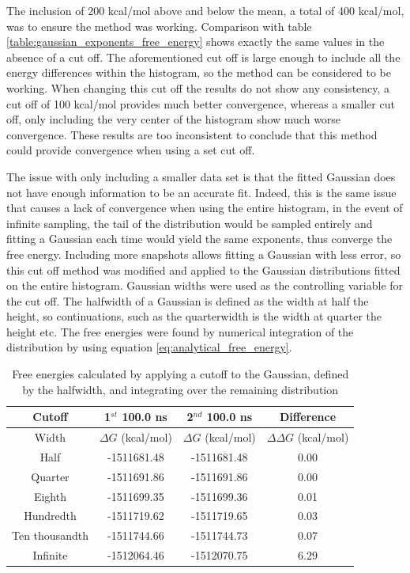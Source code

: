 The inclusion of 200 kcal/mol above and below the mean, a total of 400 kcal/mol, was to ensure the method was working.  Comparison with table \ref{table:gaussian_exponents_free_energy} shows exactly the same values in the absence of a cut off.  The aforementioned cut off is large enough to include all the energy differences within the histogram, so the method can be considered to be working.  When changing this cut off the results do not show any consistency, a cut off of 100 kcal/mol provides much better convergence, whereas a smaller cut off, only including the very center of the histogram show much worse convergence.  These results are too inconsistent to conclude that this method could provide convergence when using a set cut off.

The issue with only including a smaller data set is that the fitted Gaussian does not have enough information to be an accurate fit.  Indeed, this is the same issue that causes a lack of convergence when using the entire histogram, in the event of infinite sampling, the tail of the distribution would be sampled entirely and fitting a Gaussian each time would yield the same exponents, thus converge the free energy.  Including more snapshots allows fitting a Gaussian with less error, so this cut off method was modified and applied to the Gaussian distributions fitted on the entire histogram.  Gaussian widths were used as the controlling variable for the cut off.  The halfwidth of a Gaussian is defined as the width at half the height, so continuations, such as the quarterwidth is the width at quarter the height etc.  The free energies were found by numerical integration of the distribution by using equation \ref{eq:analytical_free_energy}.

\begin{table}[ht]
 \caption{Free energies calculated by applying a cutoff to the Gaussian, defined by the halfwidth, and integrating over the remaining distribution}
  \begin{center}
  \begin{tabular}{c|c|c|c}
   \hline\hline
Cutoff & 1$^{st}$ 100.0 ns & 2$^{nd}$ 100.0 ns & Difference \\
 \hline
Width & $\Delta G$ (kcal/mol) & $\Delta G$ (kcal/mol) & $\Delta\Delta G$ (kcal/mol) \\
 \hline
Half & -1511681.48 & -1511681.48 & 0.00 \\
  \hline
Quarter & -1511691.86 & -1511691.86 & 0.00 \\
  \hline
Eighth & -1511699.35 & -1511699.36 & 0.01 \\
  \hline
Hundredth & -1511719.62 & -1511719.65 & 0.03 \\
  \hline
Ten thousandth & -1511744.66 & -1511744.73 & 0.07 \\
 \hline
Infinite & -1512064.46 & -1512070.75 & 6.29 \\
 \end{tabular}\label{table:gaussian_cutoff_free_energies}
 \end{center}
\end{table}

